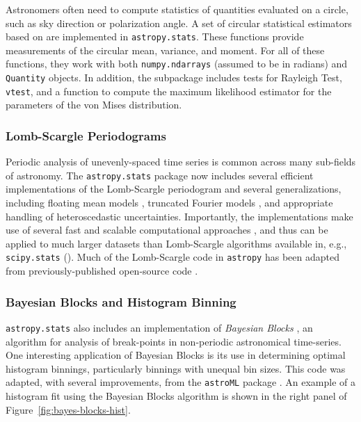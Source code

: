 \documentclass[modern]{aastex61}
\newcommand{\package}[1]{\texttt{#1}\xspace}
\newcommand{\astropypkg}{\package{astropy}}
\renewcommand{\figurename}{Figure\xspace}
\begin{document}
Astronomers often need to compute statistics of quantities evaluated on a
circle, such as sky direction or polarization angle.
A set of circular statistical estimators based on \citet{JammalamadakaSengupta}
are implemented in \package{astropy.stats}.  These functions provide
measurements of the circular mean, variance, and moment.   For all of these
functions, they work with both \texttt{numpy.ndarrays} (assumed to be in
radians) and \texttt{Quantity} objects.  In addition, the subpackage includes
tests for Rayleigh Test, \texttt{vtest}, and a function to compute the maximum
likelihood estimator for the parameters of the von Mises distribution.

\subsubsection{Lomb-Scargle Periodograms}

Periodic analysis of unevenly-spaced time series is common across many
sub-fields of astronomy. The \package{astropy.stats} package now includes
several efficient implementations of the Lomb-Scargle periodogram
\citep{Lomb76, Scargle82} and several generalizations, including floating mean
models \citep{Zechmeister09}, truncated Fourier models \citep{Bretthorst2003},
and appropriate handling of heteroscedastic uncertainties.
Importantly, the implementations make use of several fast and scalable
computational approaches \citep[e.g.,][]{Press89, Palmer09}, and thus can be
applied to much larger datasets than Lomb-Scargle algorithms available in,
e.g., \package{scipy.stats} (\citealt{scipy}). Much of the Lomb-Scargle code
in \astropypkg has been adapted from previously-published open-source code
\citep{astroML, VanderPlas2015}.

\subsubsection{Bayesian Blocks and Histogram Binning}
\package{astropy.stats} also includes an implementation of
{\it Bayesian Blocks} \citep{Scargle2013}, an algorithm for analysis of
break-points in non-periodic astronomical time-series. One interesting
application of Bayesian Blocks is its use in determining optimal histogram
binnings, particularly binnings with unequal bin sizes.
This code was adapted, with several improvements, from the \package{astroML}
package \citep{astroML}. An example of a histogram fit using the Bayesian
Blocks algorithm is shown in the right panel of
\figurename~\ref{fig:bayes-blocks-hist}.
\end{document}
